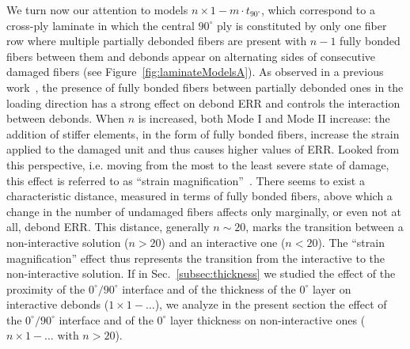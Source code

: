 \documentclass[Review,sagev,times]{sagej}
\begin{document}
We turn now our attention to models $n\times 1-m\cdot t_{90^{\circ}}$, which correspond to a cross-ply laminate in which the central $90^{\circ}$ ply is constituted by only one fiber row where multiple partially debonded fibers are present with $n-1$ fully bonded fibers between them and debonds appear on alternating sides of consecutive damaged fibers (see Figure~\ref{fig:laminateModelsA}). %
As observed in a previous work~\cite{DiStasio2019}, the presence of fully bonded fibers between partially debonded ones in the loading direction has a strong effect on debond ERR and controls the interaction between debonds. When $n$ is increased, both Mode I and Mode II increase: the addition of stiffer elements, in the form of fully bonded fibers, increase the strain applied to the damaged unit and thus causes higher values of ERR. Looked from this perspective, i.e. moving from the most to the least severe state of damage, this effect is referred to as ``strain magnification''~\cite{DiStasio2019}. There seems to exist a characteristic distance, measured in terms of fully bonded fibers, above which a change in the number of undamaged fibers affects only marginally, or even not at all, debond ERR. This distance, generally $n\sim20$, marks the transition between a non-interactive solution ($n>20$) and an interactive one ($n<20$). The ``strain magnification'' effect thus represents the transition from the interactive to the non-interactive solution. If in Sec.~\ref{subsec:thickness} we studied the effect of the proximity of the $0^{\circ}/90^{\circ}$ interface and of the thickness of the $0^{\circ}$ layer on interactive debonds ($1\times 1-\dots$), we analyze in the present section the effect of the $0^{\circ}/90^{\circ}$ interface and of the $0^{\circ}$ layer thickness on non-interactive ones ($n\times 1-\dots\text{ with }n>20$).\\
\end{document}
